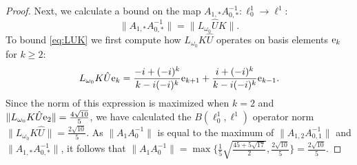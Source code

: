 \begin{proof}
Next, we calculate a bound on the map $ A_{1,*}     A_{0,*}^{-1}: \ell^1_0 \to \ell^1$:
\begin{equation}\label{eq:LUK}
  \| A_{1,*}     A_{0,*}^{-1} \| =  \| L_{\omega_0} \hat{U} K \| .
\end{equation}
To bound \eqref{eq:LUK} we first compute how $L_{\omega_0} K \hat{U}    $ operates on basis elements $\mathrm{e}_k$ for $k\geq 2$: 
\[
L_{\omega_0} K \hat{U}     \mathrm{e}_{k} = \frac{ -i+(-i)^k }{k-i (-i)^{k}}   \mathrm{e}_{k+1}
+
\frac{ i+(-i)^k  }{k-i (-i)^{k}}   \mathrm{e}_{k-1} .
\]
Since the norm of this expression is maximized when $k=2$ and $  \| L_{\omega_0} K \hat{U}    \mathrm{e}_2 \| = \tfrac{4\sqrt{10}}{5}$,
 we have calculated the $B(\ell^1_0,\ell^1)$ operator norm $ \|L_{\omega_0} K \hat{U}      \| = \tfrac{2\sqrt{10}}{5}$. 
As $\|A_1A_{0}^{-1}\|$ is equal to the maximum of  $ \| A_{1,2} A_{0,1}^{-1}\|$ and $\|A_{1,*}     A_{0,*}^{-1}\|$, it follows that 
	$ \| A_1 A_0^{-1}\| = \max\{ \frac{1}{5}\sqrt{\frac{45+5\sqrt{17}}{2}}, \frac{2 \sqrt{10}}{5} \}  = \frac{2 \sqrt{10}}{5}$.
%
\end{proof}

